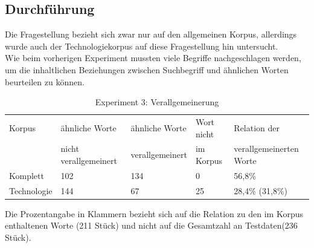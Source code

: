 \documentclass[12pt,a4paper]{report}
\begin{document}
		\subsection{Durchführung}
		Die Fragestellung bezieht sich zwar nur auf den allgemeinen Korpus, allerdings wurde auch der Technologiekorpus auf diese Fragestellung hin untersucht.\\
		Wie beim vorherigen Experiment mussten viele Begriffe nachgeschlagen werden,  um die inhaltlichen Beziehungen zwischen Suchbegriff und ähnlichen Worten beurteilen zu können.\\
		
\begin{table}[H]
\caption{Experiment 3: Verallgemeinerung}
\begin{center}
\begin{tabular}{|l||l|l|l|l|}
\hline
Korpus & ähnliche Worte & ähnliche Worte  & Wort nicht  & Relation der\\
 & nicht verallgemeinert & verallgemeinert & im Korpus & verallgemeinerten Worte\\

\hline
\hline
 Komplett & 102 & 134 & 0 & 56,8\% \\
 \hline
 Technologie & 144 & 67 & 25 & 28,4\% (31,8\%)\\
 \hline
 
\end{tabular}
\end{center}
\end{table}

		Die Prozentangabe in Klammern bezieht sich auf die Relation zu den im Korpus enthaltenen Worte (211 Stück) und nicht auf die Gesamtzahl an Testdaten(236 Stück).\\
		
\end{document}
